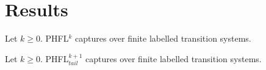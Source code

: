\section{Results}

\begin{frame}

\begin{theorem}
    Let $k \geq 0$. PHFL$^k$ captures  over finite labelled transition systems.
\end{theorem}

\begin{theorem}
    Let $k \geq 0$. PHFL$^{k+1}_{tail}$ captures  over finite labelled transition systems.
\end{theorem}

\end{frame}
